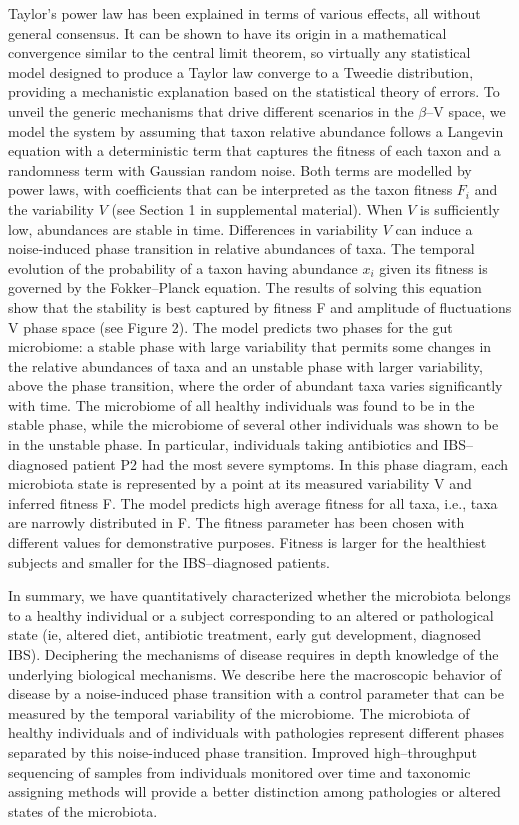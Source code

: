 \documentclass[aps,prl,twocolumn,superscriptaddress,showpacs]{revtex4}
\begin{document}
Taylor's power law has been explained in terms of various effects, all without general consensus. It can be shown to have its origin in a mathematical convergence similar to the central limit theorem, so virtually any statistical model designed to produce a Taylor law converge to a Tweedie distribution\cite{stat}, providing a mechanistic explanation based on the statistical theory of errors\cite{convergence1,convergence2,convergence3}. To unveil the generic mechanisms that drive different scenarios in the $\beta$--V space, we model the system by assuming that taxon relative abundance follows a Langevin equation with a deterministic term that captures the fitness of each taxon and a randomness term with Gaussian random noise\cite{ranking}. Both terms are modelled by power laws, with coefficients that can be interpreted as the taxon fitness $F_i$ and the variability $V$ (see Section 1 in supplemental material). When $V$ is sufficiently low, abundances are stable in time.  Differences in variability $V$ can induce a noise-induced phase transition in relative abundances of taxa. The temporal evolution of the probability of a taxon having abundance $x_i$ given its fitness is governed by the Fokker--Planck equation. The results of solving this equation show that  the stability is best captured by fitness F and amplitude of fluctuations V phase space (see Figure 2). 
The model predicts two phases for the gut microbiome: a stable phase with large variability that permits some changes in the relative abundances of taxa and an unstable phase with larger variability, above the phase transition, where the order of abundant taxa varies significantly with time. The microbiome of all healthy individuals was found to be in the stable phase, while the microbiome of several other individuals was shown to be in the unstable phase. In particular, individuals taking antibiotics and IBS--diagnosed patient P2 had the most severe symptoms. In this phase diagram, each microbiota state is represented by a point at its measured variability V and inferred fitness F. The model predicts high average fitness for all taxa, i.e., taxa are narrowly distributed in F. The fitness parameter has been chosen with different values for demonstrative purposes. Fitness is larger for the healthiest subjects and smaller for the IBS--diagnosed patients.  

In summary, we have quantitatively characterized whether the microbiota belongs to a healthy individual or a subject corresponding to an altered or pathological state (ie, altered diet, antibiotic treatment, early gut development, diagnosed IBS). Deciphering the mechanisms of disease requires in depth knowledge of the underlying biological mechanisms. We describe here the macroscopic behavior of disease by a noise-induced phase transition with a control parameter that can be measured by the temporal variability of the microbiome. The microbiota of healthy individuals and of individuals with pathologies represent different phases separated by this noise-induced phase transition. Improved high--throughput sequencing of samples from individuals monitored over time and taxonomic assigning methods will provide a better distinction among pathologies or altered states of the microbiota. 
\end{document}
